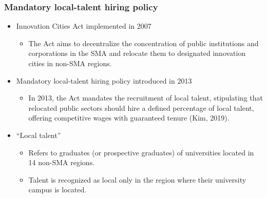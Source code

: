 \documentclass[aspectratio=169,xcolor=dvipsnames,handout]{beamer}
\begin{document}
\begin{frame}
    \frametitle{Mandatory local-talent hiring policy}
    \begin{itemize}[<+->]
        \item Innovation Cities Act implemented in 2007
        \begin{itemize}[<+->]
            \item The Act aims to decentralize the concentration of public institutions and corporations in the SMA and relocate them to designated innovation cities in non-SMA regions. 
        \end{itemize}
        \item Mandatory local-talent hiring policy introduced in 2013
        \begin{itemize}[<+->]
            \item In 2013, the Act mandates the recruitment of local talent, stipulating that relocated public sectors should hire a defined percentage of local talent, offering competitive wages with guaranteed tenure (Kim, 2019). 
        \end{itemize}
        \item ``Local talent''
        \begin{itemize}[<+->]
            \item Refers to graduates (or prospective graduates) of universities located in 14 non-SMA regions.
            \item Talent is recognized as local only in the region where their university campus is located. 
        \end{itemize}
    \end{itemize}
\end{frame}
\end{document}
